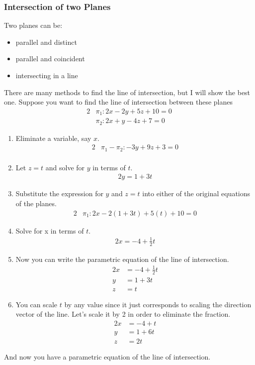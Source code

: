 \documentclass[letterpaper, 12pt]{report}
\theoremstyle{definition}
\numberwithin{equation}{section}
\begin{document}
\subsubsection{Intersection of two Planes}
Two planes can be:
\begin{itemize}
	\item parallel and distinct
	\item parallel and coincident
	\item intersecting in a line
\end{itemize}
There are many methods to find the line of intersection, but I will show the best one. Suppose you want to find the line of intersection between these planes
\begin{alignat*}{2}{}
	&\pi_1 : 2x-2y+5z+10=0 \\
	&\pi_2 : 2x+y-4z+7=0
\end{alignat*}
\begin{enumerate}
	\item Eliminate a variable, say $x$.
\begin{alignat*}{2}{}
	&\pi_1 - \pi_2: -3y+9z+3=0 \\
\end{alignat*}
	\item Let $z=t$ and solve for $y$ in terms of $t$.
\begin{alignat*}{2}{}
	y=1+3t
\end{alignat*}
	\item Substitute the expression for $y$ and $z=t$ into either of the original equations of the planes.
\begin{alignat*}{2}{}
	&\pi_1 : 2x - 2 (1+3t) + 5(t) + 10 = 0
\end{alignat*}
	\item Solve for x in terms of $t$.
\begin{alignat*}{2}{}
	x = -4 + \frac{1}{2}t
\end{alignat*}
	\item Now you can write the parametric equation of the line of intersection.
	\begin{alignat*}{2}{}
		x &= -4 + \frac{1}{2}t \\
		y &= 1 + 3t \\
		z &= t
	\end{alignat*}
	\item You can scale $t$ by any value since it just corresponds to scaling the direction vector of the line. Let's scale it by 2 in order to eliminate the fraction.
	\begin{alignat*}{2}{}
		x &= -4 + t \\
		y &= 1 + 6t \\
		z &= 2t
	\end{alignat*}
\end{enumerate}
And now you have a parametric equation of the line of intersection.
\end{document}
